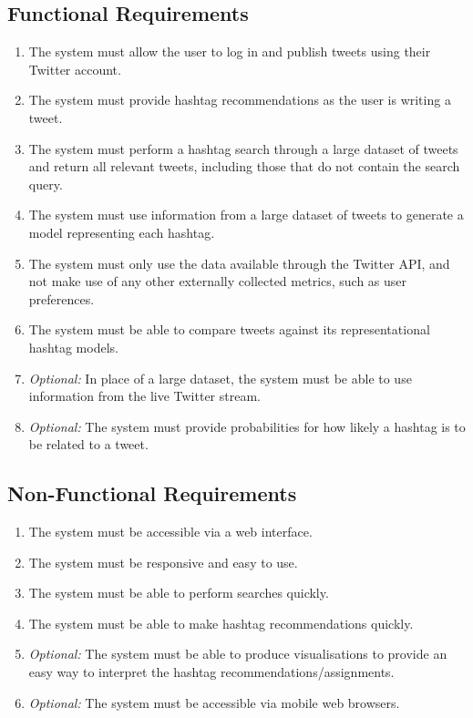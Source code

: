 \documentclass[11pt,a4paper]{report}
\begin{document}
\subsection{Functional Requirements}
\begin{enumerate}
    \item \label{func:publish} The system must allow the user to log in and publish tweets using their Twitter account.
    \item \label{func:suggest} The system must provide hashtag recommendations as the user is writing a tweet.
    \item \label{func:search} The system must perform a hashtag search through a large dataset of tweets and return all relevant tweets, including those that do not contain the search query.
    \item \label{func:genmodel} The system must use information from a large dataset of tweets to generate a model representing each hashtag.
    \item \label{func:notpersonal} The system must only use the data available through the Twitter API, and not make use of any other externally collected metrics, such as user preferences.
    \item \label{func:compmodels} The system must be able to compare tweets against its representational hashtag models.
    \item \label{func:stream} \emph{Optional:} In place of a large dataset, the system must be able to use information from the live Twitter stream.
    \item \label{func:probabilities} \emph{Optional:} The system must provide probabilities for how likely a hashtag is to be related to a tweet.
\end{enumerate}

\subsection{Non-Functional Requirements}
\begin{enumerate}
    \item \label{nfunc:web} The system must be accessible via a web interface.
    \item \label{nfunc:easy} The system must be responsive and easy to use.
    \item \label{nfunc:qsearch} The system must be able to perform searches quickly.
    \item \label{nfunc:qsuggest} The system must be able to make hashtag recommendations quickly.
    \item \label{nfunc:graphs} \emph{Optional:} The system must be able to produce visualisations to provide an easy way to interpret the hashtag recommendations/assignments.
    \item \label{nfunc:mobile} \emph{Optional:} The system must be accessible via mobile web browsers.
\end{enumerate}
\end{document}
